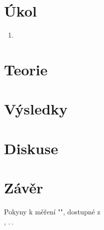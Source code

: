 \documentclass{protokol}
\begin{document}
  \section*{Úkol}

    \begin{enumerate}
      \item 
    \end{enumerate}

  \section*{Teorie}

  \section*{Výsledky}

  \section*{Diskuse}

  \section*{Závěr}

  \begin{thebibliography}{}

    Pokyny k měření "", dostupné z\\ \url{}, .\,.\,
  
  \end{thebibliography}
\end{document}
